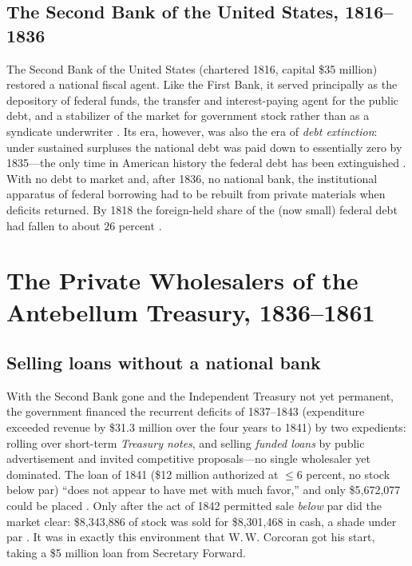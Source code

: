 \documentclass[12pt]{article}
\begin{document}
\subsection{The Second Bank of the United States, 1816--1836}

The Second Bank of the United States (chartered 1816, capital \$35 million)
restored a national fiscal agent. Like the First Bank, it served principally as
the depository of federal funds, the transfer and interest-paying agent for the
public debt, and a stabilizer of the market for government stock rather than as
a syndicate underwriter \citep{catterall1903second}. Its era, however, was also
the era of \emph{debt extinction}: under sustained surpluses the national debt
was paid down to essentially zero by 1835---the only time in American history
the federal debt has been extinguished \citep{lane2014nation}. With no debt to
market and, after 1836, no national bank, the institutional apparatus of
federal borrowing had to be rebuilt from private materials when deficits
returned. By 1818 the foreign-held share of the (now small) federal debt had
fallen to about $26$ percent \citep{wilkins1989history}.

\section{The Private Wholesalers of the Antebellum Treasury, 1836--1861}

\subsection{Selling loans without a national bank}

With the Second Bank gone and the Independent Treasury not yet permanent, the
government financed the recurrent deficits of 1837--1843 (expenditure exceeded
revenue by \$31.3 million over the four years to 1841) by two expedients: rolling
over short-term \emph{Treasury notes}, and selling \emph{funded loans} by public
advertisement and invited competitive proposals---no single wholesaler yet
dominated. The loan of 1841 (\$12 million authorized at $\le 6$ percent, no stock
below par) ``does not appear to have met with much favor,'' and only
\$5{,}672{,}077 could be placed \citep[363]{bayley1881national}. Only after the
act of 1842 permitted sale \emph{below} par did the market clear: \$8{,}343{,}886
of stock was sold for \$8{,}301{,}468 in cash, a shade under par
\citep[363--364]{bayley1881national}. It was in exactly this environment that
W.\,W. Corcoran got his start, taking a \$5 million loan from Secretary Forward.
\end{document}
